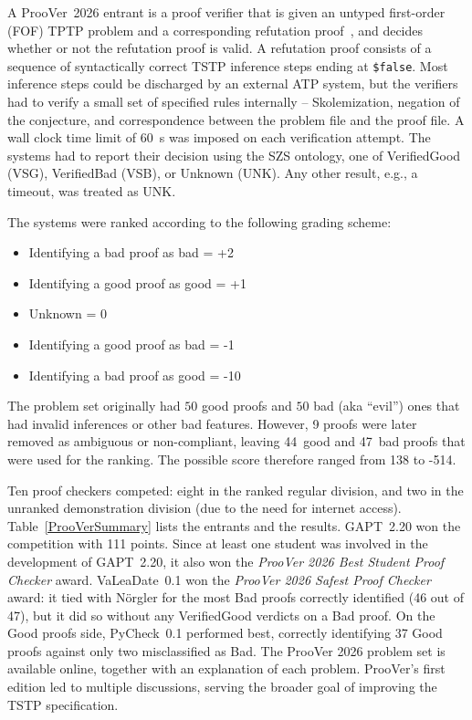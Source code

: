 \documentclass[aic]{iosart2x}
\begin{document}
A ProoVer~2026 entrant is a proof verifier that is given an untyped first-order (FOF) TPTP 
problem and a corresponding refutation proof~\cite{SS+06}, and decides whether or not 
the refutation proof is valid.
A refutation proof consists of a sequence of syntactically correct TSTP inference steps ending
at \texttt{\$false}.
Most inference steps could be discharged by an external ATP system, but the verifiers had to
verify a small set of specified rules internally -- Skolemization, negation of the conjecture, 
and correspondence between the problem file and the proof file.
A wall clock time limit of 60~s was imposed on each verification attempt.
The systems had to report their decision using the SZS ontology, one of VerifiedGood (VSG), 
VerifiedBad (VSB), or Unknown (UNK).
Any other result, e.g., a timeout, was treated as UNK.

The systems were ranked according to the following grading scheme:
\begin{itemize}
    \item Identifying a bad proof as bad = +2
    \item Identifying a good proof as good = +1
    \item Unknown = 0
    \item Identifying a good proof as bad = -1
    \item Identifying a bad proof as good = -10
\end{itemize}
The problem set originally had $50$ good proofs and $50$ bad (aka ``evil'') ones that had 
invalid inferences or other bad features.
However, 9 proofs were later removed as ambiguous or non-compliant, leaving 44~good and
47~bad proofs that were used for the ranking. 
The possible score therefore ranged from 138 to -514.

Ten proof checkers competed: eight in the ranked regular division, and two in the unranked 
demonstration division (due to the need for internet access).
Table~\ref{ProoVerSummary} lists the entrants and the results. 
GAPT~2.20 won the competition with 111 points.
Since at least one student was involved in the development of GAPT~2.20, it also won the 
\textit{ProoVer 2026 Best Student Proof Checker} award.
VaLeaDate~0.1 won the \emph{ProoVer 2026 Safest Proof Checker} award: it tied with N\"orgler 
for the most Bad proofs correctly identified (46 out of 47), but it did so without any 
VerifiedGood verdicts on a Bad proof.
On the Good proofs side, PyCheck~0.1 performed best, correctly identifying 37 Good proofs against 
only two misclassified as Bad.
The ProoVer 2026 problem set is available online, together with an explanation of each problem.
ProoVer's first edition led to multiple discussions, serving the broader goal of improving the 
TSTP specification.
\end{document}
